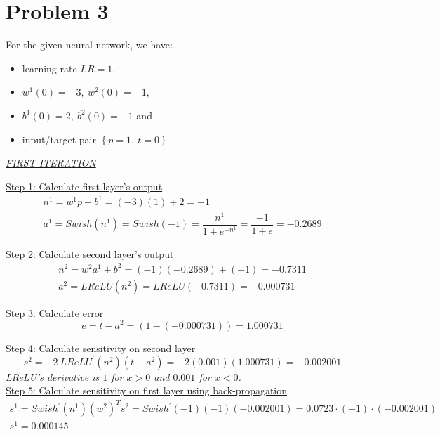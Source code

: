 \section{Problem 3}

For the given neural network, we have:
\begin{itemize}
	\item learning rate $LR = 1$,
	\item $w^1\left(0\right) = -3,\ w^2\left(0\right) = -1$,
	\item $b^1\left(0\right) = 2,\ b^2\left(0\right) = -1$ and
	\item input/target pair $\left\{p=1,\ t=0\right\}$
\end{itemize}
\vspace*{1mm}

\begin{center}
	\underline{\textit{FIRST ITERATION}}
\end{center}

\underline{Step 1: Calculate first layer's output}
\[
\begin{gathered}
n^1 = w^1 p + b^1 = (-3)(1) + 2 = -1\\
a^1 = {Swish}\left(n^1\right) = {Swish}\left(-1\right) = \dfrac{n^1}{1+e^{-n^1}} = \dfrac{-1}{1+e} = -0.2689
\end{gathered}
\]

\underline{Step 2: Calculate second layer's output}
\[
\begin{gathered}
n^2 = w^2 a^1 + b^2 = (-1)(-0.2689) + (-1) = -0.7311 \\ 
a^2 = {LReLU}\left(n^2\right) = {LReLU}\left(-0.7311\right) = -0.000731
\end{gathered}
\]

\underline{Step 3: Calculate error}
\[
e = t-a^2 = \left(1-\left(-0.000731\right)\right) = 1.000731
\]

\underline{Step 4: Calculate sensitivity on second layer}
\[
s^2 = -2\ {LReLU}^{'}\left(n^2\right)\left(t-a^2\right) = -2 \left(0.001\right) \left(1.000731\right) = -0.002001
\]
\textit{\small LReLU's derivative is $1$ for $x>0$ and $0.001$ for $x<0$.}\\ 

\underline{Step 5: Calculate sensitivity on first layer using back-propagation}
\[
\begin{gathered}
s^1 = Swish^{'} \left(n^1\right) \left(w^2\right)^T s^2 = Swish^{'} \left(-1\right) \left(-1\right) \left(-0.002001\right) = 0.0723 \cdot (-1) \cdot \left(-0.002001\right) \\
s^1 = 0.000145
\end{gathered}
\]

